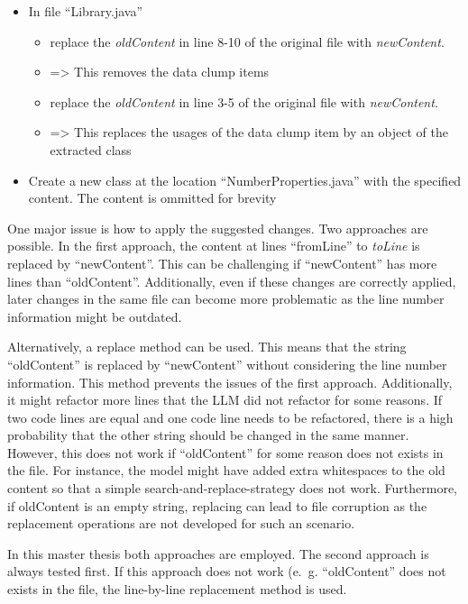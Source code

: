 \begin{itemize}
    \item In file \enquote{Library.java}
    \begin{itemize}
        \item replace the \textit{oldContent} in line 8-10 of the original file with \textit{newContent}.
        \item => This removes the data clump items
       \item replace the \textit{oldContent} in line 3-5 of the original file with \textit{newContent}.
        \item => This replaces the usages of the data clump item by an object of the extracted class 
    \end{itemize}
    \item Create a new class at the location \enquote{NumberProperties.java} with the specified content. The content is ommitted for brevity
\end{itemize}



One major issue is how to apply the suggested changes. Two approaches are possible.
In the first approach, the content at lines \enquote{fromLine} to \textit{toLine} is replaced by \enquote{newContent}. This can be challenging if \enquote{newContent} has more lines than \enquote{oldContent}. Additionally, even if these  changes are correctly applied, later changes in the same file can become more problematic as the line number information might be outdated. 

Alternatively, a replace method can be used. This means that the string \enquote{oldContent} is replaced by \enquote{newContent} without considering the line number information. This method prevents the issues of the first approach. Additionally, it might refactor more lines that the \ac{LLM} did not refactor for some reasons. If two code lines are equal and one code line needs to be refactored, there is a high probability that the other string should be changed in the same manner. However, this does not work if \enquote{oldContent} for some reason does not exists in the file. For instance, the model might have added extra whitespaces to the old content so that a simple search-and-replace-strategy does not work. Furthermore, if oldContent is an empty string, replacing can lead to file corruption as the replacement operations are not developed for such an scenario. 

In this master thesis both approaches are employed. The second approach is always tested first. If this approach does not work (e.~g. \enquote{oldContent} does not exists in the file, the line-by-line replacement method is used.  

